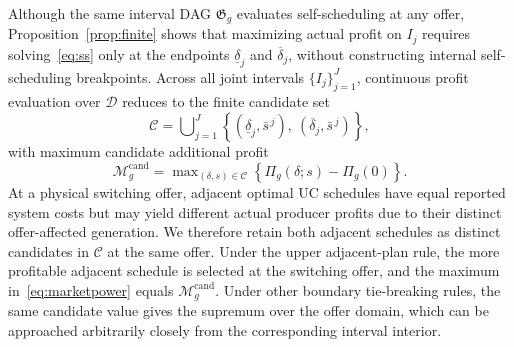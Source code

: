 \documentclass[journal]{IEEEtran}
\begin{document}
Although the same interval DAG $\mathfrak{G}_g$ evaluates self-scheduling at any offer, Proposition~\ref{prop:finite} shows that maximizing actual profit on $I_j$ requires solving~\eqref{eq:ss} only at the endpoints $\underline{\delta}_j$ and $\overline{\delta}_j$, without constructing internal self-scheduling breakpoints. Across all joint intervals $\{I_j\}_{j=1}^{J}$, continuous profit evaluation over $\mathcal{D}$ reduces to the finite candidate set
\begin{equation}
\mathcal{C} = \bigcup\nolimits_{j=1}^{J}
\left\{ (\underline{\delta}_j,\bar{s}^{\,j}),\ (\overline{\delta}_j,\bar{s}^{\,j}) \right\},\label{eq:candidate-set}
\end{equation}
with maximum candidate additional profit
\begin{equation}
\mathcal{M}_g^{\mathrm{cand}} = \max\nolimits_{(\delta,s)\in\mathcal{C}}
\left\{ \Pi_g(\delta;s) - \Pi_g(0) \right\}.\label{eq:candidate-value}
\end{equation}
At a physical switching offer, adjacent optimal UC schedules have equal reported system costs but may yield different actual producer profits due to their distinct offer-affected generation. We therefore retain both adjacent schedules as distinct candidates in $\mathcal{C}$ at the same offer. Under the upper adjacent-plan rule, the more profitable adjacent schedule is selected at the switching offer, and the maximum in~\eqref{eq:marketpower} equals $\mathcal{M}_g^{\mathrm{cand}}$. Under other boundary tie-breaking rules, the same candidate value gives the supremum over the offer domain, which can be approached arbitrarily closely from the corresponding interval interior.
\end{document}
